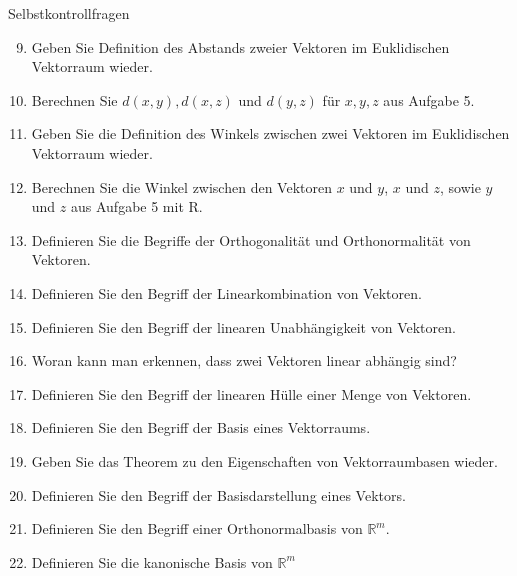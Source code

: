 \documentclass[
  8pt,
  ignorenonframetext,
]{beamer}
\providecommand{\tightlist}{%
  \setlength{\itemsep}{0pt}\setlength{\parskip}{0pt}}
\begin{document}
\begin{frame}{Selbstkontrollfragen}
\protect\hypertarget{selbstkontrollfragen-1}{}
\footnotesize
{}

\begin{enumerate}
\setcounter{enumi}{8}
\tightlist
\item
  Geben Sie Definition des Abstands zweier Vektoren im Euklidischen
  Vektorraum wieder.
\item
  Berechnen Sie \(d(x,y), d(x,z)\) und \(d(y,z)\) für \(x,y,z\) aus
  Aufgabe 5.
\item
  Geben Sie die Definition des Winkels zwischen zwei Vektoren im
  Euklidischen Vektorraum wieder.
\item
  Berechnen Sie die Winkel zwischen den Vektoren \(x\) und \(y\), \(x\)
  und \(z\), sowie \(y\) und \(z\) aus Aufgabe 5 mit R.
\item
  Definieren Sie die Begriffe der Orthogonalität und Orthonormalität von
  Vektoren.
\item
  Definieren Sie den Begriff der Linearkombination von Vektoren.
\item
  Definieren Sie den Begriff der linearen Unabhängigkeit von Vektoren.
\item
  Woran kann man erkennen, dass zwei Vektoren linear abhängig sind?
\item
  Definieren Sie den Begriff der linearen Hülle einer Menge von
  Vektoren.
\item
  Definieren Sie den Begriff der Basis eines Vektorraums.
\item
  Geben Sie das Theorem zu den Eigenschaften von Vektorraumbasen wieder.
\item
  Definieren Sie den Begriff der Basisdarstellung eines Vektors.
\item
  Definieren Sie den Begriff einer Orthonormalbasis von
  \(\mathbb{R}^m\).
\item
  Definieren Sie die kanonische Basis von \(\mathbb{R}^m\)
\end{enumerate}
\end{frame}
\end{document}
